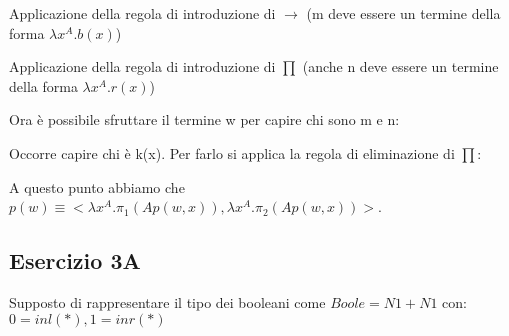 Applicazione della regola di introduzione di $\rightarrow$ (m deve essere un termine della forma $\lambda x^A . b(x)$)

\begin{prooftree}
\end{prooftree}

Applicazione della regola di introduzione di $\prod$ (anche n deve essere un termine della forma $\lambda x^A . r(x)$)

\begin{prooftree}
\end{prooftree}

Ora è possibile sfruttare il termine w per capire chi sono m e n:

\begin{prooftree}
\end{prooftree}

Occorre capire chi è k(x). Per farlo si applica la regola di eliminazione di $\prod$:

\begin{prooftree}
\end{prooftree}

A questo punto abbiamo che $p(w) \equiv <\lambda x^A . \pi_1(Ap(w, x)),\lambda x^A . \pi_2(Ap(w, x))>$.

\subsection{Esercizio 3A}

Supposto di rappresentare il tipo dei booleani come $Boole = N1 + N1$ con:
$0 = inl(*), 1 = inr(*)$

